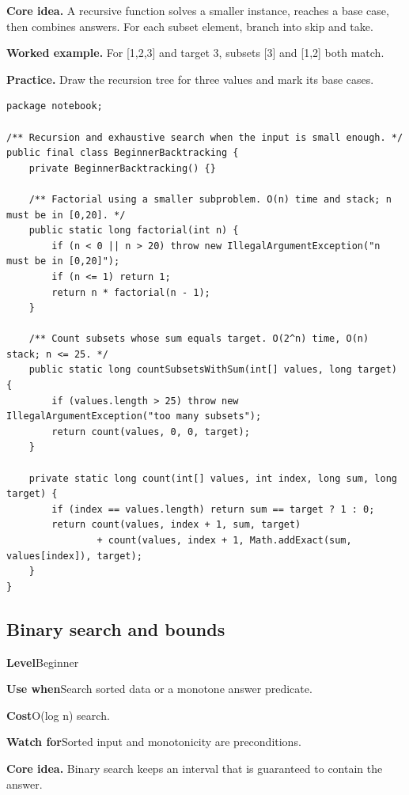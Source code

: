 \documentclass[10pt,letterpaper]{article}
\newcommand{\entrylabel}[1]{\textcolor{accent}{\bfseries #1}}
\begin{document}
\noindent\textbf{Core idea.} A recursive function solves a smaller instance, reaches a base case, then combines answers. For each subset element, branch into skip and take.\par
\noindent\textbf{Worked example.} For [1,2,3] and target 3, subsets [3] and [1,2] both match.\par
\noindent\textbf{Practice.} Draw the recursion tree for three values and mark its base cases.\par
\begin{lstlisting}
package notebook;

/** Recursion and exhaustive search when the input is small enough. */
public final class BeginnerBacktracking {
    private BeginnerBacktracking() {}

    /** Factorial using a smaller subproblem. O(n) time and stack; n must be in [0,20]. */
    public static long factorial(int n) {
        if (n < 0 || n > 20) throw new IllegalArgumentException("n must be in [0,20]");
        if (n <= 1) return 1;
        return n * factorial(n - 1);
    }

    /** Count subsets whose sum equals target. O(2^n) time, O(n) stack; n <= 25. */
    public static long countSubsetsWithSum(int[] values, long target) {
        if (values.length > 25) throw new IllegalArgumentException("too many subsets");
        return count(values, 0, 0, target);
    }

    private static long count(int[] values, int index, long sum, long target) {
        if (index == values.length) return sum == target ? 1 : 0;
        return count(values, index + 1, sum, target)
                + count(values, index + 1, Math.addExact(sum, values[index]), target);
    }
}
\end{lstlisting}
\subsection{Binary search and bounds}
\begin{guidebox}\small
\entrylabel{Level}\quad Beginner\par
\entrylabel{Use when}\quad Search sorted data or a monotone answer predicate.\par
\entrylabel{Cost}\quad O(log n) search.\par
\entrylabel{Watch for}\quad Sorted input and monotonicity are preconditions.\par
\end{guidebox}
\noindent\textbf{Core idea.} Binary search keeps an interval that is guaranteed to contain the answer.\par
\end{document}
